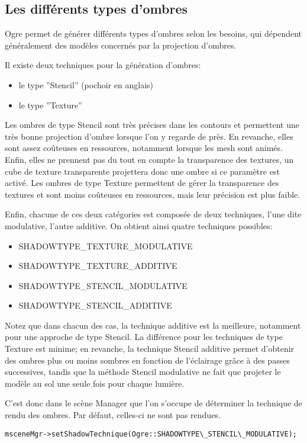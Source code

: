 \documentclass[10pt,a4paper]{report}
\begin{document}
\subsection{Les diff\'erents types d'ombres}

Ogre permet de g\'en\'erer diff\'erents types d'ombres selon les besoins, qui d\'ependent g\'en\'eralement des mod\`eles concern\'es par la projection d'ombres.

Il existe deux techniques pour la g\'en\'eration d'ombres:
\begin{itemize}
\item le type ''Stencil'' (pochoir en anglais)
\item le type ''Texture''
\end{itemize}

Les ombres de type Stencil sont tr\`es pr\'ecises dans les contours et permettent une tr\`es bonne projection d'ombre lorsque l'on y regarde de pr\`es. En revanche, elles sont assez co\^uteuses en ressources, notamment lorsque les mesh sont anim\'es. Enfin, elles ne prennent pas du tout en compte la transparence des textures, un cube de texture transparente projettera donc une ombre si ce param\`etre est activ\'e.
Les ombres de type Texture permettent de g\'erer la transparence des textures et sont moins co\^uteuses en ressources, mais leur pr\'ecision est plus faible.

Enfin, chacune de ces deux cat\'egories est compos\'ee de deux techniques, l'une dite modulative, l'autre additive. On obtient ainsi quatre techniques possibles:
\begin{itemize}
\item SHADOWTYPE\_TEXTURE\_MODULATIVE
\item SHADOWTYPE\_TEXTURE\_ADDITIVE
\item SHADOWTYPE\_STENCIL\_MODULATIVE
\item SHADOWTYPE\_STENCIL\_ADDITIVE
\end{itemize}


Notez que dans chacun des cas, la technique additive est la meilleure, notamment pour une approche de type Stencil. La diff\'erence pour les techniques de type Texture est minime; en revanche, la technique Stencil additive permet d'obtenir des ombres plus ou moins sombres en fonction de l'\'eclairage gr\^{a}ce \`{a} des passes successives, tandis que la m\'ethode Stencil modulative ne fait que projeter le mod\`ele au sol une seule fois pour chaque lumi\`ere.

C'est donc dans le sc\`ene Manager que l'on s'occupe de d\'eterminer la technique de rendu des ombres. Par d\'efaut, celles-ci ne sont pas rendues.
\begin{lstlisting}
msceneMgr->setShadowTechnique(Ogre::SHADOWTYPE\_STENCIL\_MODULATIVE);
\end{lstlisting}
\end{document}
